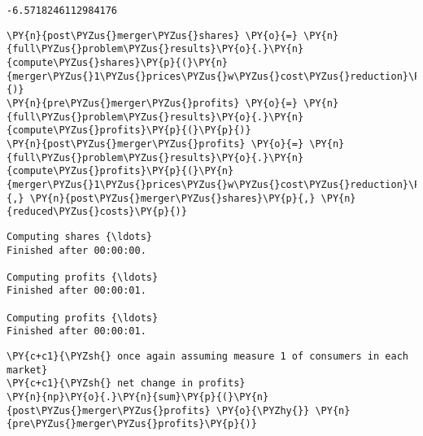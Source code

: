             \begin{tcolorbox}[breakable, size=fbox, boxrule=.5pt, pad at break*=1mm, opacityfill=0]
\begin{Verbatim}[commandchars=\\\{\}]
-6.5718246112984176
\end{Verbatim}
\end{tcolorbox}

    \begin{tcolorbox}[breakable, size=fbox, boxrule=1pt, pad at break*=1mm,colback=cellbackground, colframe=cellborder]
\begin{Verbatim}[commandchars=\\\{\}]
\PY{n}{post\PYZus{}merger\PYZus{}shares} \PY{o}{=} \PY{n}{full\PYZus{}problem\PYZus{}results}\PY{o}{.}\PY{n}{compute\PYZus{}shares}\PY{p}{(}\PY{n}{merger\PYZus{}1\PYZus{}prices\PYZus{}w\PYZus{}cost\PYZus{}reduction}\PY{p}{)}
\PY{n}{pre\PYZus{}merger\PYZus{}profits} \PY{o}{=} \PY{n}{full\PYZus{}problem\PYZus{}results}\PY{o}{.}\PY{n}{compute\PYZus{}profits}\PY{p}{(}\PY{p}{)}
\PY{n}{post\PYZus{}merger\PYZus{}profits} \PY{o}{=} \PY{n}{full\PYZus{}problem\PYZus{}results}\PY{o}{.}\PY{n}{compute\PYZus{}profits}\PY{p}{(}\PY{n}{merger\PYZus{}1\PYZus{}prices\PYZus{}w\PYZus{}cost\PYZus{}reduction}\PY{p}{,} \PY{n}{post\PYZus{}merger\PYZus{}shares}\PY{p}{,} \PY{n}{reduced\PYZus{}costs}\PY{p}{)}
\end{Verbatim}
\end{tcolorbox}

    \begin{Verbatim}[commandchars=\\\{\}]
Computing shares {\ldots}
Finished after 00:00:00.

Computing profits {\ldots}
Finished after 00:00:01.

Computing profits {\ldots}
Finished after 00:00:01.

    \end{Verbatim}

    \begin{tcolorbox}[breakable, size=fbox, boxrule=1pt, pad at break*=1mm,colback=cellbackground, colframe=cellborder]
\begin{Verbatim}[commandchars=\\\{\}]
\PY{c+c1}{\PYZsh{} once again assuming measure 1 of consumers in each market}
\PY{c+c1}{\PYZsh{} net change in profits}
\PY{n}{np}\PY{o}{.}\PY{n}{sum}\PY{p}{(}\PY{n}{post\PYZus{}merger\PYZus{}profits} \PY{o}{\PYZhy{}} \PY{n}{pre\PYZus{}merger\PYZus{}profits}\PY{p}{)}
\end{Verbatim}
\end{tcolorbox}

